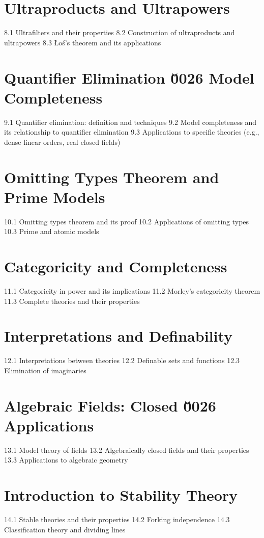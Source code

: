 \section{Ultraproducts and Ultrapowers}
8.1 Ultrafilters and their properties
8.2 Construction of ultraproducts and ultrapowers
8.3 Łoś's theorem and its applications
\section{Quantifier Elimination \u0026 Model Completeness}
9.1 Quantifier elimination: definition and techniques
9.2 Model completeness and its relationship to quantifier elimination
9.3 Applications to specific theories (e.g., dense linear orders, real closed fields)
\section{Omitting Types Theorem and Prime Models}
10.1 Omitting types theorem and its proof
10.2 Applications of omitting types
10.3 Prime and atomic models
\section{Categoricity and Completeness}
11.1 Categoricity in power and its implications
11.2 Morley's categoricity theorem
11.3 Complete theories and their properties
\section{Interpretations and Definability}
12.1 Interpretations between theories
12.2 Definable sets and functions
12.3 Elimination of imaginaries
\section{Algebraic Fields: Closed \u0026 Applications}
13.1 Model theory of fields
13.2 Algebraically closed fields and their properties
13.3 Applications to algebraic geometry
\section{Introduction to Stability Theory}
14.1 Stable theories and their properties
14.2 Forking independence
14.3 Classification theory and dividing lines
